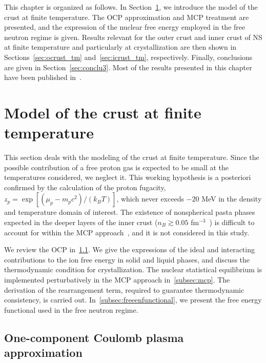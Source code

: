 This chapter is organized as follows. In Section~\ref{sec:modelcrusttemp}, we
introduce the model of the crust at finite temperature. The OCP approximation 
and MCP treatment are presented, and the expression of the nuclear free energy 
employed in the free neutron regime is given. 
Results relevant for the outer crust and inner crust of NS at finite 
temperature and particularly at crystallization are then shown in 
Sections~\ref{sec:ocrust_tm} and~\ref{sec:icrust_tm}, respectively.
Finally, conclusions are given in Section~\ref{sec:conclu3}.
Most of the results presented in this chapter have been 
published in~\cite{Fantina2020,Carreau2019,Carreau2020}.

\minitoc\newpage

\section{Model of the crust at finite temperature}\label{sec:modelcrusttemp}

This section deals with the modeling of the crust at finite temperature. 
Since the possible contribution of a free proton gas is expected to be small at 
the temperatures considered, we neglect it. This working hypothesis 
is a posteriori confirmed by the calculation of the proton fugacity, 
$z_p = \exp[(\mu_p-m_pc^2)/(k_B T)]$, which never exceeds $-20$ MeV in 
the density and temperature domain of interest. 
The existence of nonspherical pasta phases expected in the deeper layers of the 
inner crust ($n_B \gtrsim 0.05$ fm$^{-3}$~\cite{Pearson2020}) is difficult to 
account for within the MCP approach~\cite{Barros2020}, and 
it is not considered in this study.

We review the OCP in~\ref{subsec:ocp}. 
We give the expressions of the ideal and interacting
contributions to the ion free energy in solid and liquid phases, and discuss 
the thermodynamic condition for crystallization. The 
nuclear statistical equilibrium is implemented perturbatively in the MCP 
approach in~\ref{subsec:mcp}. The derivation of the rearrangement term, 
required to guarantee thermodynamic consistency, is carried out.
In~\ref{subsec:freeenfunctional}, we present the free energy functional used in
the free neutron regime.

\subsection{One-component Coulomb plasma approximation}\label{subsec:ocp}

